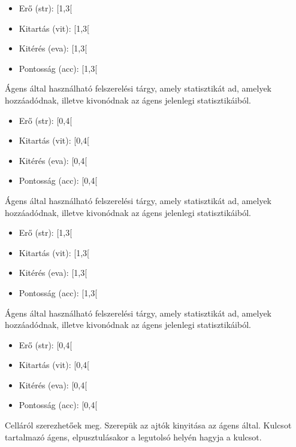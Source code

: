 \begin{itemize}
    \item Erő (str): [1,3[
    \item Kitartás (vit): [1,3[
    \item Kitérés (eva): [1,3[
    \item Pontosság (acc): [1,3[
\end{itemize}



Ágens által használható felszerelési tárgy, amely statisztikát ad, amelyek hozzáadódnak, illetve kivonódnak az ágens jelenlegi statisztikáiból.

\begin{itemize}
    \item Erő (str): [0,4[
    \item Kitartás (vit): [0,4[
    \item Kitérés (eva): [0,4[
    \item Pontosság (acc): [0,4[
\end{itemize}


Ágens által használható felszerelési tárgy, amely statisztikát ad, amelyek hozzáadódnak, illetve kivonódnak az ágens jelenlegi statisztikáiból.

\begin{itemize}
    \item Erő (str): [1,3[
    \item Kitartás (vit): [1,3[
    \item Kitérés (eva): [1,3[
    \item Pontosság (acc): [1,3[
\end{itemize}


Ágens által használható felszerelési tárgy, amely statisztikát ad, amelyek hozzáadódnak, illetve kivonódnak az ágens jelenlegi statisztikáiból.

\begin{itemize}
    \item Erő (str): [0,4[
    \item Kitartás (vit): [0,4[
    \item Kitérés (eva): [0,4[
    \item Pontosság (acc): [0,4[
\end{itemize}


Celláról szerezhetőek meg.
Szerepük az ajtók kinyitása az ágens által.
Kulcsot tartalmazó ágens, elpusztulásakor a legutolsó helyén hagyja a kulcsot.

